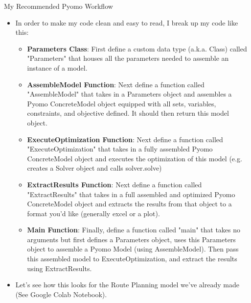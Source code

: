 \documentclass[10pt, aspectratio=169]{beamer}
\begin{document}
\begin{frame}{My Recommended Pyomo Workflow}
    \begin{itemize}
        \item In order to make my code clean and easy to read, I break up my code like this:
        \begin{itemize}
            \item \textbf{Parameters Class}: First define a custom data type (a.k.a. Class) called "Parameters" that houses all the parameters needed to assemble an instance of a model.
            \item \textbf{AssembleModel Function}: Next define a function called "AssembleModel" that takes in a Parameters object and assembles a Pyomo ConcreteModel object equipped with all sets, variables, constraints, and objective defined. It should then return this model object.
            \item \textbf{ExecuteOptimization Function}: Next define a function called "ExecuteOptimization" that takes in a fully assembled Pyomo ConcreteModel object and executes the optimization of this model (e.g. creates a Solver object and calls solver.solve)
            \item \textbf{ExtractResults Function}: Next define a function called "ExtractResults" that takes in a full assembled and optimized Pyomo ConcreteModel object and extracts the results from that object to a format you'd like (generally excel or a plot).
            \item \textbf{Main Function}: Finally, define a function called "main" that takes no arguments but first defines a Parameters object, uses this Parameters object to assemble a Pyomo Model (using AssembleModel). Then pass this assembled model to ExecuteOptimization, and extract the results using ExtractResults.
        \end{itemize}
        \item Let's see how this looks for the Route Planning model we've already made (See Google Colab Notebook).
    \end{itemize}
\end{frame}
\end{document}
